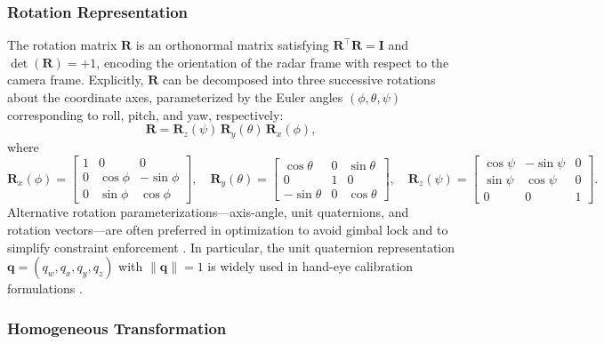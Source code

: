 \subsubsection{Rotation Representation}

The rotation matrix $\mathbf{R}$ is an orthonormal matrix satisfying $\mathbf{R}^{\top}\mathbf{R} = \mathbf{I}$ and $\det(\mathbf{R}) = +1$, encoding the orientation of the radar frame with respect to the camera frame. Explicitly, $\mathbf{R}$ can be decomposed into three successive rotations about the coordinate axes, parameterized by the Euler angles $(\phi, \theta, \psi)$ corresponding to roll, pitch, and yaw, respectively:
\begin{equation}\label{eq:rotation_matrix}
  \mathbf{R} = \mathbf{R}_{z}(\psi)\,\mathbf{R}_{y}(\theta)\,\mathbf{R}_{x}(\phi),
\end{equation}
where
\begin{equation}
\mathbf{R}_{x}(\phi)=\begin{bmatrix}1&0&0\\0&\cos\phi&-\sin\phi\\0&\sin\phi&\cos\phi\end{bmatrix},\quad
\mathbf{R}_{y}(\theta)=\begin{bmatrix}\cos\theta&0&\sin\theta\\0&1&0\\-\sin\theta&0&\cos\theta\end{bmatrix},\quad
\mathbf{R}_{z}(\psi)=\begin{bmatrix}\cos\psi&-\sin\psi&0\\\sin\psi&\cos\psi&0\\0&0&1\end{bmatrix}.
\end{equation}
Alternative rotation parameterizations---axis-angle, unit quaternions, and rotation vectors---are often preferred in optimization to avoid gimbal lock and to simplify constraint enforcement \cite{peretroukhin2020motion}. In particular, the unit quaternion representation $\mathbf{q} = (q_w, q_x, q_y, q_z)$ with $\|\mathbf{q}\| = 1$ is widely used in hand-eye calibration formulations \cite{daniilidis1999handeye}.

\subsubsection{Homogeneous Transformation}

